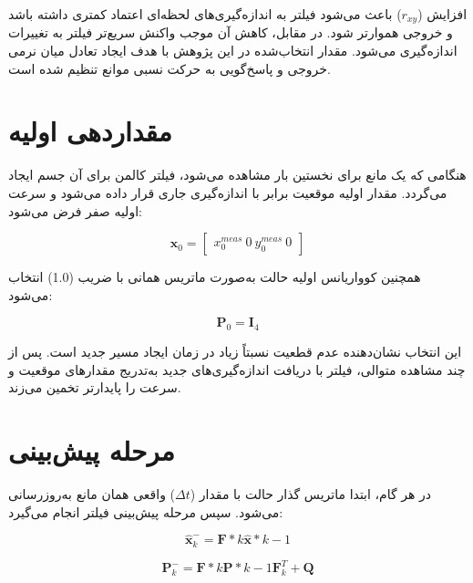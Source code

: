 افزایش ($r_{xy}$) باعث می‌شود فیلتر به اندازه‌گیری‌های لحظه‌ای اعتماد کمتری داشته باشد و خروجی هموارتر شود. در مقابل، کاهش آن موجب واکنش سریع‌تر فیلتر به تغییرات اندازه‌گیری می‌شود. مقدار انتخاب‌شده در این پژوهش با هدف ایجاد تعادل میان نرمی خروجی و پاسخ‌گویی به حرکت نسبی موانع تنظیم شده است.

\section{مقداردهی اولیه}

هنگامی که یک مانع برای نخستین بار مشاهده می‌شود، فیلتر کالمن برای آن جسم ایجاد می‌گردد. مقدار اولیه موقعیت برابر با اندازه‌گیری جاری قرار داده می‌شود و سرعت اولیه صفر فرض می‌شود:

\begin{equation}
	\mathbf{x}_0 =
	\begin{bmatrix}
		x^{meas}_0 \
		0 \
		y^{meas}_0 \
		0
	\end{bmatrix}
	\label{eq:app_kalman_initial_state}
\end{equation}

همچنین کوواریانس اولیه حالت به‌صورت ماتریس همانی با ضریب (1.0) انتخاب می‌شود:

\begin{equation}
	\mathbf{P}_0 = \mathbf{I}_4
	\label{eq:app_kalman_initial_cov}
\end{equation}

این انتخاب نشان‌دهنده عدم قطعیت نسبتاً زیاد در زمان ایجاد مسیر جدید است. پس از چند مشاهده متوالی، فیلتر با دریافت اندازه‌گیری‌های جدید به‌تدریج مقدارهای موقعیت و سرعت را پایدارتر تخمین می‌زند.

\section{مرحله پیش‌بینی}

در هر گام، ابتدا ماتریس گذار حالت با مقدار ($\Delta t$) واقعی همان مانع به‌روزرسانی می‌شود. سپس مرحله پیش‌بینی فیلتر انجام می‌گیرد:

\begin{equation}
	\hat{\mathbf{x}}^{-}_k =
	\mathbf{F}*k \hat{\mathbf{x}}*{k-1}
	\label{eq:app_kalman_predict_state}
\end{equation}

\begin{equation}
	\mathbf{P}^{-}_k =
	\mathbf{F}*k \mathbf{P}*{k-1}\mathbf{F}_k^{T}
	+
	\mathbf{Q}
	\label{eq:app_kalman_predict_cov}
\end{equation}

